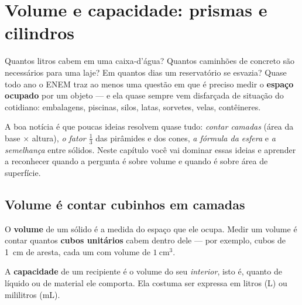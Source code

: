 
\section{Volume e capacidade: prismas e cilindros}

Quantos litros cabem em uma caixa-d'água? Quantos caminhões de concreto são
necessários para uma laje? Em quantos dias um reservatório se esvazia? Quase todo
ano o ENEM traz ao menos uma questão em que é preciso medir o \textbf{espaço
ocupado} por um objeto — e ela quase sempre vem disfarçada de situação do
cotidiano: embalagens, piscinas, silos, latas, sorvetes, velas, contêineres.

A boa notícia é que poucas ideias resolvem quase tudo: \emph{contar camadas}
(área da base $\times$ altura), \emph{o fator $\frac13$} das pirâmides e dos cones,
\emph{a fórmula da esfera} e \emph{a semelhança} entre sólidos. Neste capítulo
você vai dominar essas ideias e aprender a reconhecer quando a pergunta é sobre
volume e quando é sobre área de superfície.

\subsection{Volume é contar cubinhos em camadas}

\begin{definicao}
O \textbf{volume} de um sólido é a medida do espaço que ele ocupa. Medir um volume
é contar quantos \textbf{cubos unitários} cabem dentro dele — por exemplo, cubos de
1~cm de aresta, cada um com volume de $1\ \text{cm}^3$.

A \textbf{capacidade} de um recipiente é o volume do seu \emph{interior}, isto é,
quanto de líquido ou de material ele comporta. Ela costuma ser expressa em
litros (L) ou mililitros (mL).
\end{definicao}

